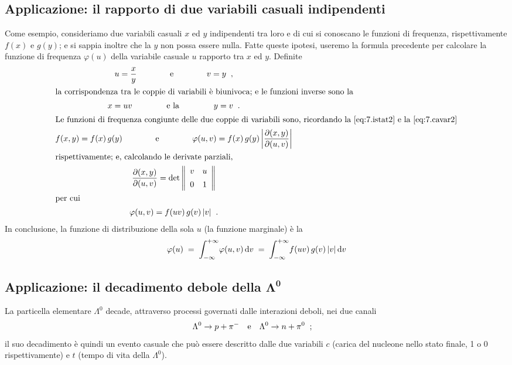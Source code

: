 \subsection{Applicazione: il rapporto di due variabili
  casuali indipendenti}%
Come esempio, consideriamo due variabili casuali $x$ ed $y$
indipendenti tra loro e di cui si conoscano le funzioni di
frequenza, rispettivamente $f(x)$ e $g(y)$; e si sappia
inoltre che la $y$ non possa essere nulla.  Fatte queste
ipotesi, useremo la formula precedente per calcolare la
funzione di frequenza $\varphi(u)$ della variabile casuale
$u$ rapporto tra $x$ ed $y$.  Definite
\begin{gather*}
  u = \dfrac{x}{y} \makebox[30mm]{e} v = y \peq , \\
  \intertext{la corrispondenza tra le coppie di variabili
    \`e biunivoca; e le funzioni inverse sono la}
  x = uv \makebox[35mm]{e la} y = v \peq . \\
  \intertext{Le funzioni di frequenza congiunte delle due
    coppie di variabili sono, ricordando la
    \eqref{eq:7.istat2} e la \eqref{eq:7.cavar2}}
  f(x,y) = f(x) \, g(y) \makebox[30mm]{e}
  \varphi(u,v) =  f(x) \, g(y) \left| \frac{ \partial (x,y) }{
      \partial (u,v) } \right| \\
  \intertext{rispettivamente; e, calcolando le derivate
    parziali,}
  \frac{ \partial (x,y) }{ \partial (u,v) } = \det \left\|
    \begin{array}{cc}
      v & u \\[1ex]
      0 & 1
    \end{array} \right\| \\
  \intertext{per cui}
  \varphi(u,v) = f(uv) \, g(v) \, |v| \peq .
\end{gather*}
In conclusione, la funzione di distribuzione della sola $u$
(la funzione marginale) \`e la
\begin{equation} \label{eq:7.rapvar}
  \varphi(u) \; = \; \int_{-\infty}^{+\infty} \!
  \varphi(u,v) \, \mathrm{d} v \; = \; \int_{-\infty}^{+\infty} \!
  f(uv) \, g(v) \, |v| \, \mathrm{d} v
\end{equation}%

\subsection[Applicazione: il decadimento debole della
  $\Lambda^0$]{Applicazione: il decadimento debole della
  $\boldsymbol{\Lambda}^{\boldsymbol{0}}$}
La particella elementare $\Lambda^0$ decade, attraverso
processi governati dalle interazioni deboli, nei due canali
\begin{align*}
  \Lambda^0 &\to p + \pi^- &&\text{e} & \Lambda^0 &\to n +
  \pi^0 \;\; ;
\end{align*}
il suo decadimento \`e quindi un evento casuale che pu\`o
essere descritto dalle due variabili $c$ (carica del
nucleone nello stato finale, 1 o 0 rispettivamente) e $t$
(tempo di vita della $\Lambda^0$).

